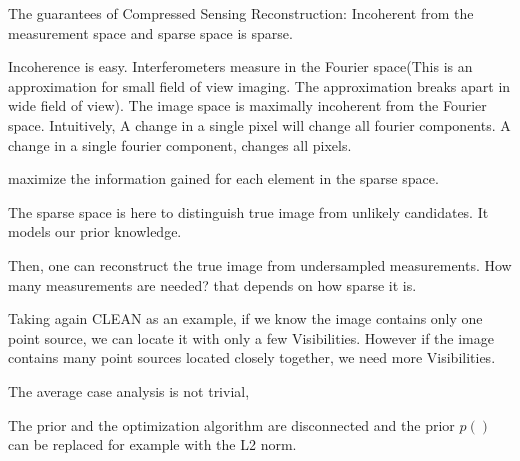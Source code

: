 The guarantees of Compressed Sensing Reconstruction: Incoherent from the measurement space and sparse space is sparse.

Incoherence is easy. Interferometers measure in the Fourier space(This is an approximation for small field of view imaging. The approximation breaks apart in wide field of view). The image space is maximally incoherent from the Fourier space. Intuitively, A change in a single pixel will change all fourier components. A change in a single fourier component, changes all pixels.

maximize the information gained for each element in the sparse space.

The sparse space is here to distinguish true image from unlikely candidates. It models our prior knowledge.

Then, one can reconstruct the true image from undersampled measurements. How many measurements are needed? that depends on how sparse it is. 

Taking again CLEAN as an example, if we know the image contains only one point source, we can locate it with only a few Visibilities. However if the image contains many point sources located closely together, we need more Visibilities.

The average case analysis is not trivial, 

The prior and the optimization algorithm are disconnected and the prior $p()$ can be replaced for example with the L2 norm.








